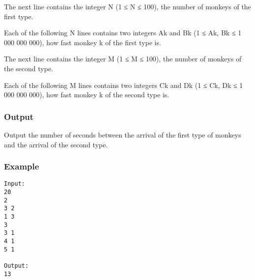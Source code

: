    The next line contains the integer N (1 ≤ N ≤ 100), the number of monkeys of the first type.  

   Each of the following N lines contains two integers Ak and Bk (1 ≤ Ak, Bk ≤ 1 000 000 000), how fast monkey k of the first type is.  

   The next line contains the integer M (1 ≤ M ≤ 100), the number of monkeys of the second type.  

   Each of the following M lines contains two integers Ck and Dk (1 ≤ Ck, Dk ≤ 1 000 000 000), how fast monkey k of the second type is.  

\subsubsection{   Output  }

   Output the number of seconds between the arrival of the first type of monkeys and the arrival of the second type.  

\subsubsection{   Example  }
\begin{verbatim}
Input:
20
2
3 2
1 3
3
3 1
4 1
5 1

Output:
13

\end{verbatim}